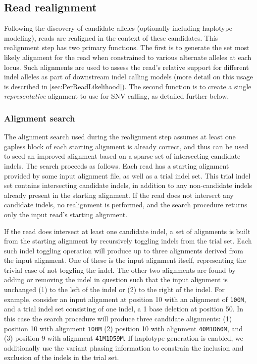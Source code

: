 \documentclass{article}
\begin{document}
\fi %


\subsection{Read realignment}
\label{sec:realignment}

Following the discovery of candidate alleles (optionally including haplotype modeling), reads are realigned in the context of these candidates. This realignment step has two primary functions. The first is to generate the set most likely alignment for the read when constrained to various alternate alleles at each locus. Such alignments are used to assess the read's relative support for different indel alleles as part of downstream indel calling models (more detail on this usage is described in \ref{sec:PerReadLikelihood}). The second function is to create a single \textit{representative} alignment to use for SNV calling, as detailed further below.

\subsubsection{Alignment search}
The alignment search used during the realignment step assumes at least one gapless block of each starting alignment is already correct, and thus can be used to seed an improved alignment based on a sparse set of intersecting candidate indels. The search proceeds as follows. Each read has a starting alignment provided by some input alignment file, as well as a trial indel set. This trial indel set contains intersecting candidate indels, in addition to any non-candidate indels already present in the starting alignment. If the read does not intersect any candidate indels, no realignment is performed, and the search procedure returns only the input read's starting alignment.

If the read does intersect at least one candidate indel, a set of alignments is built from the starting alignment by recursively toggling indels from the trial set. Each such indel toggling operation will produce up to three alignments derived from the input alignment. One of these is the input alignment itself, representing the trivial case of not toggling the indel. The other two alignments are found by adding or removing the indel in question such that the input alignment is unchanged (1) to the left of the indel or (2) to the right of the indel. For example, consider an input alignment at position 10 with an alignment of \texttt{100M}, and a trial indel set consisting of one indel, a 1 base deletion at position 50. In this case the search procedure will produce three candidate alignments: (1) position 10 with alignment \texttt{100M} (2) position 10 with alignment \texttt{40M1D60M}, and (3) position 9 with alignment \texttt{41M1D59M}. If haplotype generation is enabled, we additionally use the variant phasing information to constrain the inclusion and exclusion of the indels in the trial set.
\end{document}
